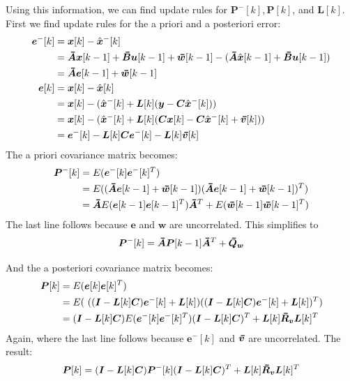 Using this information, we can find update rules for $\bm{P}^-[k], \bm{P}[k]$, and $\bm{L}[k]$. First we find update rules for the a priori and a posteriori error:
\begin{align*}
    \bm{e}^-[k] &= \bm{x}[k]-\hat{\bm{x}}^-[k] \\
                &= \thickbar{\bm{A}}\bm{x}[k-1] + \thickbar{\bm{B}}\bm{u}[k-1] + \thickbar{\bm{w}}[k-1] - (\thickbar{\bm{A}}\hat{\bm{x}}[k-1] + \thickbar{\bm{B}}\bm{u}[k-1]) \\
                &= \thickbar{\bm{A}}\bm{e}[k-1] + \thickbar{\bm{w}}[k-1] \\
    \bm{e}[k]&= \bm{x}[k] -\hat{\bm{x}}[k] \\
             &= \bm{x}[k] - (\bmhat{x}^-[k]+\bm{L}[k](\bm{y}-\bm{C}\bmhat{x}^-[k])) \\
             &= \bm{x}[k] - (\bmhat{x}^-[k]+\bm{L}[k](\bm{C}\bm{x}[k] -\bm{C}\bmhat{x}^-[k]+\bmbar{v}[k])) \\
             &= \bm{e}^-[k] - \bm{L}[k]\bm{C}\bm{e}^-[k]-\bm{L}[k]\bmbar{v}[k]
\end{align*}
The a priori covariance matrix becomes:
\begin{align*}
    \bm{P}^-[k] &= E(\bm{e}^-[k]\bm{e}^-[k]^T) \\
                &= E((\thickbar{\bm{A}}\bm{e}[k-1] + \thickbar{\bm{w}}[k-1])(\thickbar{\bm{A}}\bm{e}[k-1] + \thickbar{\bm{w}}[k-1])^T) \\
                &= \thickbar{\bm{A}}E(\bm{e}[k-1]\bm{e}[k-1]^T)\thickbar{\bm{A}}^T + E(\thickbar{\bm{w}}[k-1]\thickbar{\bm{w}}[k-1]^T)
\end{align*}
The last line follows because $\bm{e}$ and $\bm{w}$ are uncorrelated. This simplifies to
\begin{equation}
\bm{P}^-[k] = \thickbar{\bm{A}}\bm{P}[k-1]\thickbar{\bm{A}}^T + \thickbar{\bm{Q}}_{\bm{w}} \label{a_priori_covariance}
\end{equation}

And the a posteriori covariance matrix becomes:
\begin{align*}
    \bm{P}[k] &= E(\bm{e}[k]\bm{e}[k]^T) \\
              &= E(\ ((\bm{I} - \bm{L}[k]\bm{C})\bm{e}^-[k]+\bm{L}[k])((\bm{I} - \bm{L}[k]\bm{C})\bm{e}^-[k]+\bm{L}[k])^T) \\
              &= (\bm{I} - \bm{L}[k]\bm{C})E(\bm{e}^-[k]\bm{e}^-[k]^T)(\bm{I} - \bm{L}[k]\bm{C})^T + \bm{L}[k]\bmbar{R}_{\bm{v}}\bm{L}[k]^T
\end{align*}
Again, where the last line follows because $\bm{e}^-[k]$ and $\bmbar{v}$ are uncorrelated. The result:
\begin{equation}
              \bm{P}[k] = (\bm{I} - \bm{L}[k]\bm{C})\bm{P}^-[k](\bm{I} - \bm{L}[k]\bm{C})^T + \bm{L}[k]\bmbar{R}_{\bm{v}}\bm{L}[k]^T \label{a_posteriori_covariance}
\end{equation}

